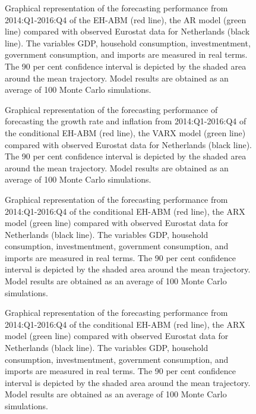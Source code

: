 \begin{figure}[!h]
	\centering
	
 \caption{Graphical representation of the forecasting performance from 2014:Q1-2016:Q4 of the EH-ABM (red line), the AR model (green line) compared with observed Eurostat data for Netherlands (black line). The variables GDP, household consumption, investmentment, government consumption, and imports are measured in real terms. The 90 per cent confidence interval is depicted by the shaded area around the mean trajectory. Model results are obtained as an average of 100 Monte Carlo simulations.}
  \label{fig:gvamacro_gvaetal_y}
\end{figure}

\begin{figure}[!h]
	\centering
	
 \caption{ Graphical representation of the forecasting performance of forecasting the growth rate and inflation from 2014:Q1-2016:Q4 of the conditional EH-ABM (red line), the VARX model (green line) compared with observed Eurostat data for Netherlands (black line). The 90 per cent confidence interval is depicted by the shaded area around the mean trajectory. Model results are obtained as an average of 100 Monte Carlo simulations.}
   \label{fig:gvamacro_growthinflation_yq}
\end{figure}

\begin{figure}[!h]
	\centering
	
	\caption{Graphical representation of the forecasting performance from 2014:Q1-2016:Q4 of the conditional EH-ABM (red line), the ARX model (green line) compared with observed Eurostat data for Netherlands (black line). The variables GDP, household consumption, investmentment, government consumption, and imports are measured in real terms. The 90 per cent confidence interval is depicted by the shaded area around the mean trajectory. Model results are obtained as an average of 100 Monte Carlo simulations.}     \label{fig:gvamacro_gvaetal_y}
\end{figure}

\begin{figure}[!h]
	\centering
	
 \caption{Graphical representation of the forecasting performance from 2014:Q1-2016:Q4 of the conditional EH-ABM (red line), the ARX model (green line) compared with observed Eurostat data for Netherlands (black line). The variables GDP, household consumption, investmentment, government consumption, and imports are measured in real terms. The 90 per cent confidence interval is depicted by the shaded area around the mean trajectory. Model results are obtained as an average of 100 Monte Carlo simulations.}
  \label{fig:gvamacro_gvaetal_y}
\end{figure}
